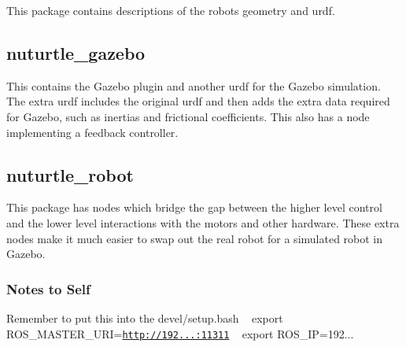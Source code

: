 This package contains descriptions of the robot\textquotesingle{}s geometry and urdf.

\subsection*{nuturtle\+\_\+gazebo}

This contains the Gazebo plugin and another urdf for the Gazebo simulation. The extra urdf includes the original urdf and then adds the extra data required for Gazebo, such as inertias and frictional coefficients. This also has a node implementing a feedback controller.

\subsection*{nuturtle\+\_\+robot}

This package has nodes which bridge the gap between the higher level control and the lower level interactions with the motors and other hardware. These extra nodes make it much easier to swap out the real robot for a simulated robot in Gazebo.

\subsubsection*{Notes to Self}

Remember to put this into the devel/setup.\+bash ~\newline
 export R\+O\+S\+\_\+\+M\+A\+S\+T\+E\+R\+\_\+\+U\+RI=\href{http://192.168.1.100:11311}{\tt http\+://192...\+:11311} ~\newline
 export R\+O\+S\+\_\+\+IP=192... 